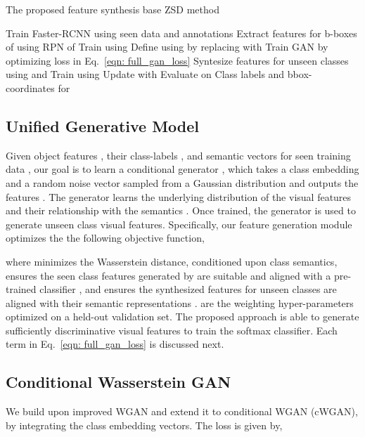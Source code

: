 \documentclass[runningheads]{llncs}
\begin{document}
\begin{algorithm*}[!t]
  \caption{The proposed  feature synthesis base ZSD method}
  \label{alg}
  \begin{algorithmic}[1]
  \Require 
\State  Train Faster-RCNN using seen data  and annotations
\State  Extract features for b-boxes of  using RPN of 
\State  Train  using 
\State  Define  using  by replacing  with 
\State  Train GAN by optimizing loss in Eq.~\ref{eqn: full_gan_loss}
\State  Syntesize features for unseen classes using  and 
\State  Train  using 
\State  Update  with 
\State Evaluate  on 
\Ensure Class labels and bbox-coordinates for 
  \end{algorithmic}
  \label{alg: main}
\end{algorithm*}



\subsection{Unified Generative Model}

Given object features , their class-labels , and semantic vectors  for seen training data , our goal is to learn a conditional generator , which takes a class embedding  and a random noise vector  sampled from a Gaussian distribution and outputs the features . The generator  learns the underlying distribution of the visual features  and their relationship with the semantics . Once trained, the generator  is used to generate unseen class visual features. Specifically, our feature generation module optimizes the the following objective function,

\noindent where  minimizes the Wasserstein distance, conditioned upon class semantics,   ensures the seen class features generated by  are suitable and aligned with a pre-trained classifier , and  ensures the synthesized features for unseen classes are aligned with their semantic representations .  are the weighting hyper-parameters optimized on a held-out validation set.  The proposed approach is able to generate sufficiently discriminative visual features to train the softmax classifier. Each term in Eq.~\ref{eqn: full_gan_loss} is discussed next.

\subsection{Conditional Wasserstein GAN}
We build upon improved WGAN \cite{gulrajani2017improved} and extend it to conditional WGAN (cWGAN), by integrating the class embedding vectors. The loss  is given by,
\end{document}
